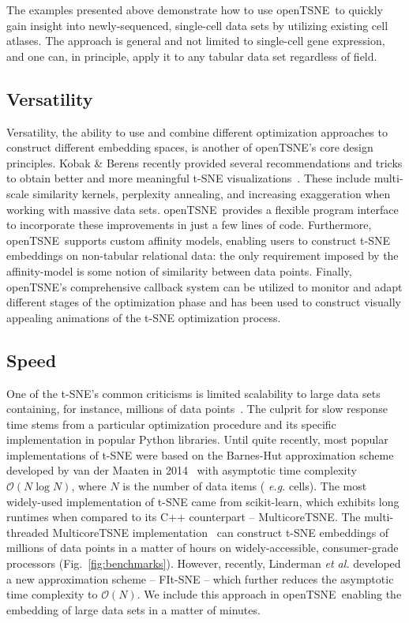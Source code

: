 \documentclass[letter]{article}
\newcommand{\opentsne}{\textsf{openTSNE}}
\begin{document}
The examples presented above demonstrate how to use \opentsne\ to quickly gain
insight into newly-sequenced, single-cell data sets by utilizing existing cell
atlases. The approach is general and not limited to single-cell gene expression,
and one can, in principle, apply it to any tabular data set regardless of field.

\subsection*{Versatility}

Versatility, the ability to use and combine different optimization approaches to
construct different embedding spaces, is another of \opentsne's core design
principles. Kobak \& Berens recently provided several recommendations and
tricks to obtain better and more meaningful t-SNE
visualizations~\cite{kobak2019art}. These include multi-scale similarity
kernels, perplexity annealing, and increasing exaggeration when working with
massive data sets. \opentsne\ provides a flexible program interface to
incorporate these improvements in just a few lines of code. Furthermore, \opentsne\
supports custom affinity models, enabling users to construct t-SNE embeddings on
non-tabular relational data: the only requirement imposed by the affinity-model
is some notion of similarity between data points.
Finally, \opentsne's comprehensive callback system can be utilized
to monitor and adapt different stages of the optimization phase and has been
used to construct visually appealing animations of the t-SNE optimization
process.


\subsection*{Speed}

One of the t-SNE's common criticisms is limited scalability to large data sets
containing, for instance, millions of data
points~\cite{becht2019dimensionality}. The culprit for slow response time stems
from a particular optimization procedure and its specific implementation in
popular Python libraries. Until quite recently, most popular
implementations of t-SNE were based on the Barnes-Hut approximation scheme
developed by van der Maaten in 2014~\cite{van2014accelerating} with asymptotic
time complexity $\mathcal{O}(N \log N)$, where $N$ is the number of data items ({\em
e.g.} cells). The most widely-used implementation of t-SNE came from
\textsf{scikit-learn}, which exhibits long runtimes when compared to its C++
counterpart -- \textsf{MulticoreTSNE}. The multi-threaded \textsf{MulticoreTSNE}
implementation~\cite{Ulyanov2016} can construct t-SNE embeddings of millions of
data points in a matter of hours on widely-accessible, consumer-grade processors
(Fig.~\ref{fig:benchmarks}). However, recently, Linderman \textit{et al.}
developed a new approximation scheme -- FIt-SNE -- which further reduces the
asymptotic time complexity to $\mathcal{O}(N)$. We include this approach in
\opentsne\, enabling the embedding of large data sets in a matter of minutes. 
\end{document}
